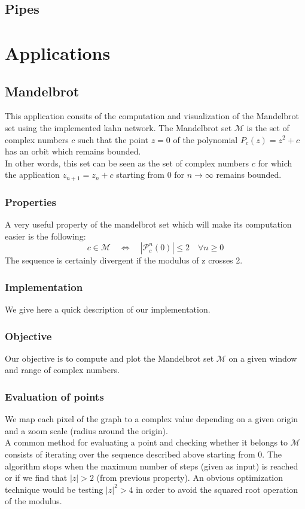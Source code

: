 \documentclass[10pt,a4paper]{article}
\begin{document}
\subsection{Pipes}



\section{Applications}
\subsection{Mandelbrot}
This application consits of the computation and visualization of the Mandelbrot set using the implemented kahn network.
The Mandelbrot set $\mathcal{M}$ is the set of complex numbers $c$ such that the point $z = 0$ of the polynomial $P_c(z) = z^2 + c$ has an orbit which remains bounded. \\
In other words, this set can be seen as the set of complex numbers $c$ for which the application $z_{n+1} = z_n + c$ starting from $0$ for $n \rightarrow \infty$ remains bounded.

\subsubsection{Properties}
A very useful property of the mandelbrot set which will make its computation easier is the following:
	$$c \in \mathcal{M}  \quad \Longleftrightarrow \quad |\mathcal{P}^n_c(0)| \leq 2 \quad \forall n\geq 0$$
The sequence is certainly divergent if the modulus of z crosses 2.

\subsubsection{Implementation}
We give here a quick description of our implementation.

\subsubsection{Objective}
Our objective is to compute and plot the Mandelbrot set $\mathcal{M}$ on a given window and range of complex numbers.

\subsubsection{Evaluation of points}
We map each pixel of the graph to a complex value depending on a given origin and a zoom scale (radius around the origin).\\
A common method for evaluating a point and checking whether it belongs to $\mathcal{M}$ consists of iterating over the sequence described above starting from $0$. The algorithm stops when the maximum number of steps (given as input) is reached or if we find that $|z| > 2$ (from previous property). An obvious optimization technique would be testing $|z|^2 > 4$ in order to avoid the squared root operation of the modulus.
\end{document}
